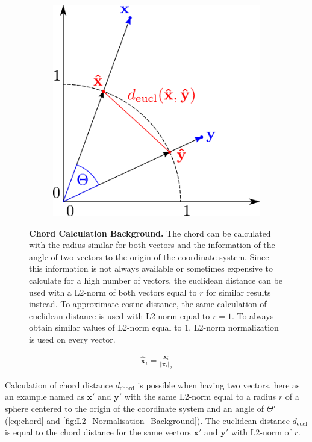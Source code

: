 \begin{figure}[!hbt]
\begin{subfigure}[b]{0.475\textwidth}
        \includegraphics[width=\textwidth]{Graphics/L2.pdf}
    \end{subfigure}
    \caption[Chord Calculation Background]{\textbf{Chord Calculation Background.} The chord can be calculated with the radius similar for both vectors and the information of the angle of two vectors to the origin of the coordinate system. Since this information is not always available or sometimes expensive to calculate for a high number of vectors, the euclidean distance can be used with a L2-norm of both vectors equal to $r$ for similar results instead. To approximate cosine distance, the same calculation of euclidean distance is used with L2-norm equal to $r = 1$. To always obtain similar values of L2-norm equal to 1, L2-norm normalization is used on every vector.}
    \label{fig:L2_Normalisation_Background}
\end{figure}

\begin{equation}\label{eq:norm2}
    \begin{aligned}
        \mathbf{\hat{x}}_i = \frac{\mathbf{x}_i}{\Vert\mathbf{x}_i\Vert_2}
    \end{aligned}
\end{equation}

Calculation of chord distance $d_{\text{chord}}$ is possible when having two vectors, here as an example named as $\mathbf{x}'$ and $\mathbf{y}'$ with the same L2-norm equal to a radius $r$ of a sphere centered to the origin of the coordinate system and an angle of $\Theta'$ (\autoref{eq:chord} and \autoref{fig:L2_Normalisation_Background}). The euclidean distance $d_{\text{eucl}}$ is equal to the chord distance for the same vectors $\mathbf{x}'$ and $\mathbf{y}'$ with L2-norm of $r$.

